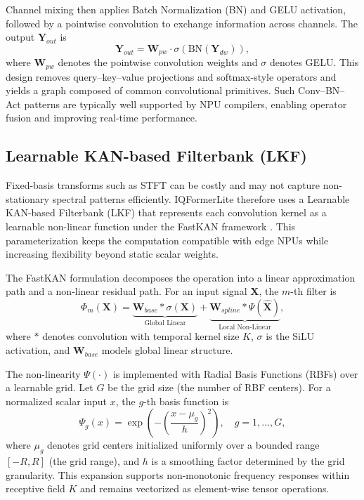 \documentclass{article}
\begin{document}
	Channel mixing then applies Batch Normalization (BN) and GELU activation, followed by a pointwise convolution to exchange information across channels.
	The output $\mathbf{Y}_{out}$ is
	\begin{equation}
		\mathbf{Y}_{out} = \mathbf{W}_{pw} \cdot \sigma(\text{BN}(\mathbf{Y}_{dw})),
	\end{equation}
	where $\mathbf{W}_{pw}$ denotes the pointwise convolution weights and $\sigma$ denotes GELU.
	This design removes query--key--value projections and softmax-style operators and yields a graph composed of common convolutional primitives.
	Such Conv--BN--Act patterns are typically well supported by NPU compilers, enabling operator fusion and improving real-time performance.
	
	\subsection{Learnable KAN-based Filterbank (LKF)}
	\label{sec:lkf}
	
	Fixed-basis transforms such as STFT can be costly and may not capture non-stationary spectral patterns efficiently.
	IQFormerLite therefore uses a Learnable KAN-based Filterbank (LKF) that represents each convolution kernel as a learnable non-linear function under the FastKAN framework \cite{li2024Kolmogorovarnoldnetworks, drokin2024Kolmogorovarnoldconvolutions}.
	This parameterization keeps the computation compatible with edge NPUs while increasing flexibility beyond static scalar weights.
	
	The FastKAN formulation decomposes the operation into a linear approximation path and a non-linear residual path.
	For an input signal $\mathbf{X}$, the $m$-th filter is
	\begin{equation}
		\Phi_m(\mathbf{X}) = \underbrace{\mathbf{W}_{base} * \sigma(\mathbf{X})}_{\text{Global Linear}} + \underbrace{\mathbf{W}_{spline} * \Psi(\mathbf{\hat{X}})}_{\text{Local Non-Linear}},
	\end{equation}
	where $*$ denotes convolution with temporal kernel size $K$, $\sigma$ is the SiLU activation, and $\mathbf{W}_{base}$ models global linear structure.
	
	The non-linearity $\Psi(\cdot)$ is implemented with Radial Basis Functions (RBFs) over a learnable grid.
	Let $G$ be the grid size (the number of RBF centers).
	For a normalized scalar input $x$, the $g$-th basis function is
	\begin{equation}
		\Psi_g(x) = \exp\left( -\left( \frac{x - \mu_g}{h} \right)^2 \right), \quad g=1,\dots,G,
		\label{eq:rbf}
	\end{equation}
	where $\mu_g$ denotes grid centers initialized uniformly over a bounded range $[-R, R]$ (the grid range), and $h$ is a smoothing factor determined by the grid granularity.
	This expansion supports non-monotonic frequency responses within receptive field $K$ and remains vectorized as element-wise tensor operations.
	
\end{document}

